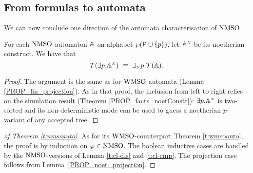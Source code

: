 \subsection{From formulas to automata}

We can now conclude one direction of the automata characterisation of $\mathrm{NMSO}$.

\begin{lemma}\label{PROP_noet_projection}
For each $\mathrm{NMSO}$-automaton $\mathbb{A}$ on alphabet $\wp (\mathsf{P} \cup \{p\})$, let $\mathbb{A}^{{\scriptscriptstyle N}}$ be its noetherian construct.
We have that
$$\mathcal{T}({{\exists} p}.\mathbb{A}^{{\scriptscriptstyle N}}) \ \equiv\
{{\exists_{{\scriptscriptstyle N}}} p}.\mathcal{T}(\mathbb{A}).
$$
\end{lemma}
\begin{proof} The argument is the same as for $\mathrm{WMSO}$-automata (Lemma \ref{PROP_fin_projection}). As in that proof, the inclusion from left to right relies on the simulation result (Theorem \ref{PROP_facts_noetConstr}): ${{\exists} p}.\mathbb{A}^{{\scriptscriptstyle N}}$ is two-sorted and its non-deterministic mode can be used to guess a noetherian $p$-variant of any accepted tree. \end{proof}

\begin{proof}[of Theorem \ref{t:nmsoauto}] As for its $\mathrm{WMSO}$-counterpart Theorem \ref{t:wmsoauto}, the proof is by induction on $\varphi \in \mathrm{NMSO}$. The boolean inductive cases are handled by the $\mathrm{NMSO}$-versions of Lemma \ref{t:cl-dis} and \ref{t:cl-cmp}. The projection case follows from Lemma~\ref{PROP_noet_projection}.
\end{proof} 

